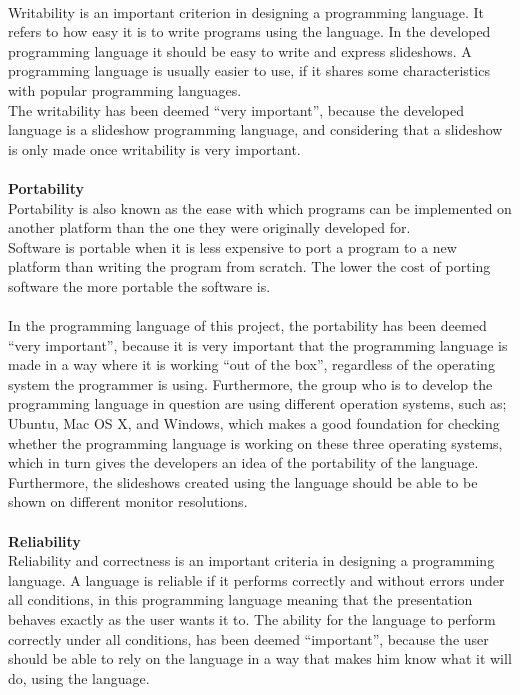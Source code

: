  \\
Writability is an important criterion in designing a programming language. It refers to how easy it is to write programs using the language. In the developed programming language it should be easy to write and express slideshows. A programming language is usually easier to use, if it shares some characteristics with popular programming languages. \\
The writability has been deemed ``very important'', because the developed language is a slideshow programming language, and considering that a slideshow is only made once writability is very important.
\\ \\
\textbf{Portability} \\
Portability is also known as the ease with which programs can be implemented on another platform than the one they were originally developed for. \\
Software is portable when it is less expensive to port a program to a new platform than writing the program from scratch. The lower the cost of porting software the more portable the software is.
\\ \\
In the programming language of this project, the portability has been deemed ``very important'', because it is very important that the programming language is made in a way where it is working ``out of the box'', regardless of the operating system the programmer is using. Furthermore, the group who is to develop the programming language in question are using different operation systems, such as; Ubuntu, Mac OS X, and Windows, which makes a good foundation for checking whether the programming language is working on these three operating systems, which in turn gives the developers an idea of the portability of the language. Furthermore, the slideshows created using the language should be able to be shown on different monitor resolutions.
\\ \\
\textbf{Reliability} \\
Reliability and correctness is an important criteria in designing a programming language. A language is reliable if it performs correctly and without errors under all conditions, in this programming language meaning that the presentation behaves exactly as the user wants it to. The ability for the language to perform correctly under all conditions, has been deemed ``important'', because the user should be able to rely on the language in a way that makes him know what it will do, using the language.
